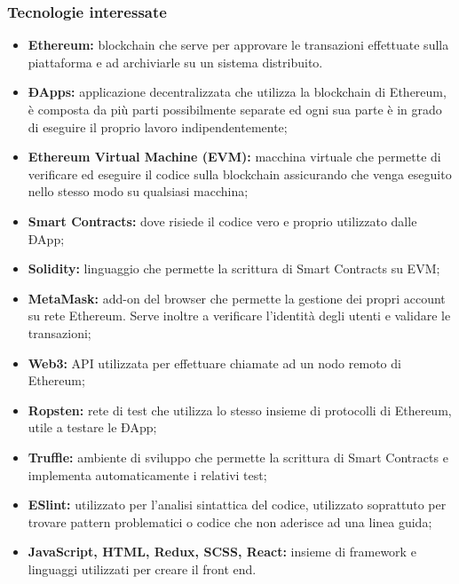 \subsubsection{Tecnologie interessate}
\begin{itemize}
	\item \textbf{Ethereum:} blockchain che serve per approvare le transazioni effettuate sulla piattaforma e ad archiviarle su un sistema distribuito. 
	
	\item \textbf{ÐApps:} applicazione decentralizzata che utilizza la blockchain di Ethereum, è composta da più parti possibilmente separate ed ogni sua parte è in grado di eseguire il proprio lavoro indipendentemente; 
	
	\item \textbf{Ethereum Virtual Machine (EVM):} macchina virtuale che permette di verificare ed eseguire il codice sulla blockchain assicurando che venga eseguito nello stesso modo su qualsiasi macchina;
	
	\item \textbf{Smart Contracts:} dove risiede il codice vero e proprio utilizzato dalle ÐApp;
	
	\item \textbf{Solidity:} linguaggio che permette la scrittura di Smart Contracts su EVM;
	
	\item \textbf{MetaMask:} add-on del browser che permette la gestione dei propri account su rete Ethereum. Serve inoltre a verificare l'identità degli utenti e validare le transazioni;
	
	\item \textbf{Web3:} API utilizzata per effettuare chiamate ad un nodo remoto di Ethereum;
	
	\item\textbf{Ropsten:} rete di test che utilizza lo stesso insieme di protocolli di Ethereum, utile a testare le ÐApp;
	
	\item\textbf{Truffle:} ambiente di sviluppo che permette la scrittura di Smart Contracts e implementa automaticamente i relativi test;
	
	\item\textbf{ESlint:} utilizzato per l'analisi sintattica del codice, utilizzato soprattuto per trovare pattern problematici o codice che non aderisce ad una linea guida;
	
	\item \textbf{JavaScript, HTML, Redux, SCSS, React:} insieme di framework e linguaggi utilizzati per creare il front end.
	
\end{itemize}


